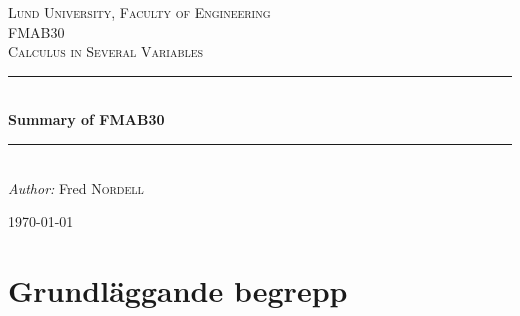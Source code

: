 \documentclass[12pt]{article} %
\begin{document}

\begin{titlepage}

\newcommand{\HRule}{\rule{\linewidth}{0.5mm}} %

\center %

\textsc{\LARGE Lund University, Faculty of Engineering}\\[1.5cm] %
\textsc{\Large FMAB30}\\[0.5cm] %
\textsc{\large Calculus in Several Variables}\\[0.5cm] %

\HRule \\[1cm]
{ \huge \bfseries Summary of FMAB30}\\[0.4cm] %
\HRule \\[1.5cm]

\emph{Author:} Fred \textsc{Nordell} %

{\large \today}\\[3cm] %


\vfill %

\end{titlepage}


\tableofcontents %

\newpage %


\section{Grundläggande begrepp} %
\end{document}
